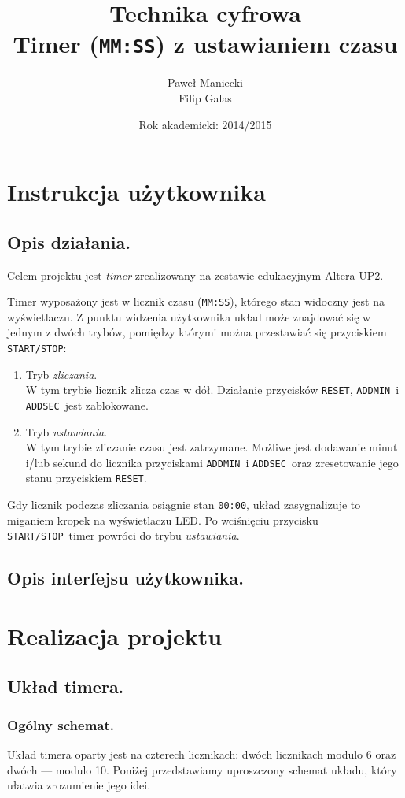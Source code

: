 \documentclass[a4paper,oneside]{report}
\title{
	\textbf{Technika cyfrowa}
	\\
	Timer (\texttt{MM:SS}) z ustawianiem czasu
	}
\author{
	Paweł Maniecki\\
	Filip Galas
	}
\date{Rok akademicki: 2014/2015}
\newcommand{\startstop}{\texttt{START/STOP}}
\newcommand{\reset}{\texttt{RESET}}
\newcommand{\addmin}{\texttt{ADD\textunderscore MIN}}
\newcommand{\addsec}{\texttt{ADD\textunderscore SEC}}
\begin{document}
\maketitle

\tableofcontents

\chapter{Instrukcja użytkownika}
\section{Opis działania.}
Celem projektu jest \emph{timer} zrealizowany na zestawie
edukacyjnym Altera UP2.

Timer wyposażony jest w licznik czasu (\texttt{MM:SS}), którego
stan widoczny jest na wyświetlaczu. Z punktu widzenia użytkownika
układ może znajdować się w jednym z dwóch trybów, pomiędzy którymi
można przestawiać się przyciskiem \startstop :
\begin{enumerate}
\item Tryb \emph{zliczania}.\\
W tym trybie licznik zlicza czas w dół. Działanie przycisków
\reset , \addmin\ i \addsec\ jest zablokowane.
\item Tryb \emph{ustawiania}.\\
W tym trybie zliczanie czasu jest zatrzymane. Możliwe jest
dodawanie minut i/lub sekund do licznika przyciskami \addmin\ i
\addsec\ oraz zresetowanie jego stanu przyciskiem \reset .
\end{enumerate}
Gdy licznik podczas zliczania osiągnie stan \texttt{00:00}, układ
zasygnalizuje to miganiem kropek na wyświetlaczu LED. Po
wciśnięciu przycisku \startstop\ timer powróci do trybu
\emph{ustawiania}.
\section{Opis interfejsu użytkownika.}

\chapter{Realizacja projektu}
\section{Układ timera.}
\subsection{Ogólny schemat.}
Układ timera oparty jest na czterech licznikach: dwóch licznikach
modulo 6 oraz dwóch --- modulo 10. Poniżej przedstawiamy
uproszczony schemat układu, który ułatwia zrozumienie jego idei.
\end{document}
